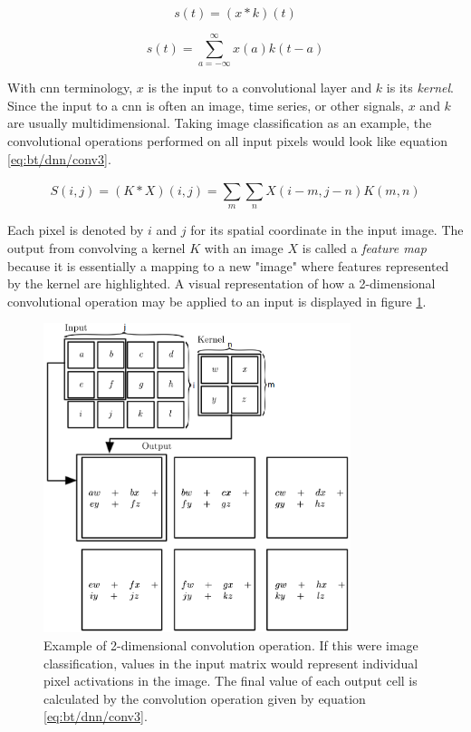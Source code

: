\begin{equation}
    \label{eq:bt/dnn/conv1}
    s(t)=(x*k)(t)
\end{equation}

\begin{equation}
    \label{eq:bt/dnn/conv2}
    s(t)=\sum_{a=-\infty}^{\infty}x(a)k(t-a)
\end{equation}

With \acrshort{cnn} terminology, $x$ is the input to a convolutional layer and $k$ is its \textit{kernel}. Since the input to a \acrshort{cnn} is often an image, time series, or other signals, $x$ and $k$ are usually multidimensional. Taking image classification as an example, the convolutional operations performed on all input pixels would look like equation \ref{eq:bt/dnn/conv3}.

\begin{equation}
    \label{eq:bt/dnn/conv3}
    S(i,j)=(K*X)(i,j)=\sum_{m}^{}\sum_{n}^{}X(i-m,j-n)K(m,n)
\end{equation}

Each pixel is denoted by $i$ and $j$ for its spatial coordinate in the input image. The output from convolving a kernel $K$ with an image $X$ is called a \textit{feature map} because it is essentially a mapping to a new "image" where features represented by the kernel are highlighted. A visual representation of how a 2-dimensional convolutional operation may be applied to an input is displayed in figure \ref{fig:bt_conv}.

\begin{figure}[h]
    \centering
    \includegraphics[width=0.8\textwidth]{figures/bt_conv.png}
    \caption{Example of 2-dimensional convolution operation. If this were image classification, values in the input matrix would represent individual pixel activations in the image. The final value of each output cell is calculated by the convolution operation given by equation \ref{eq:bt/dnn/conv3}.}
    \label{fig:bt_conv}
\end{figure}

